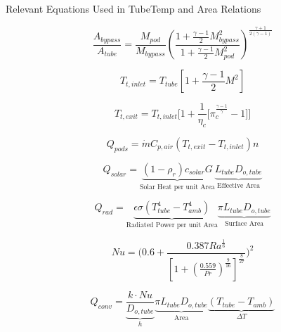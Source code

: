 
\centering
Relevant Equations Used in TubeTemp and Area Relations

\begin{equation}
	\frac{A_{bypass}}{A_{tube}} = \frac{M_{pod}}{M_{bypass}}
	\left(\frac{1+ \frac{\gamma-1}{2} M_{bypass}^2}
	{1+ \frac{\gamma-1}{2} M_{pod}^2}\right)^{\frac{\gamma+1}{2\left(\gamma-1\right)}}
	\label{e:a-over-astar}
\end{equation}

\begin{equation}
	T_{t,inlet} = T_{tube} [1 + \frac{\gamma -1}{2} M^2]
\end{equation}

\begin{equation}
	T_{t,exit} = T_{t,inlet} \Bigg[ 1 + \frac{1}{\eta_{c}} \Big[ \pi_{c}^{\frac{\gamma-1}{\gamma}}- 1 \Big] \Bigg]
\end{equation}

\begin{equation}
	{Q}_{pods}= \dot{m} C_{p,air} (T_{t,exit} - T_{t,inlet}) n
\end{equation}

\begin{equation}
	Q_{solar} = \underbrace{ (1- \rho_{r})  c_{solar}G}_\text{Solar Heat per unit Area} \underbrace{L_{tube}  D_{o,tube}}_\text{Effective Area}
\end{equation}

\begin{equation}
	Q_{rad} = \underbrace{\epsilon \sigma (T_{tube}^4 - T_{amb}^4)}_\text{Radiated Power per unit Area}\underbrace{\pi L_{tube} D_{o,tube}}_\text{Surface Area}
\end{equation}

\begin{equation}
	Nu = \Bigg(0.6 + \frac{0.387Ra^{\frac{1}{6}}}{[1+(\frac{0.559}{Pr})^{\frac{9}{16}}]^{\frac{8}{27}}}\Bigg)^2
\end{equation}

\begin{equation}
	Q_{conv} = \underbrace{ \frac{k\cdot Nu}{ {D}_{o,tube}} }_\text{$h$}
	\underbrace{ \pi {L}_{tube} {D}_{o,tube} }_\text{Area}
	\underbrace{ (T_{tube}-T_{amb})  }_\text{$\Delta T$}
\end{equation}

